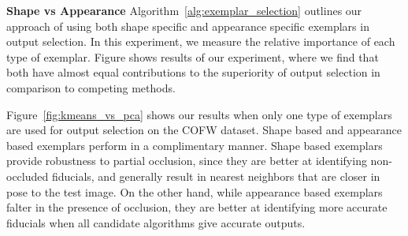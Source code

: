  
\textbf{Shape vs Appearance}
\label{subsec:shape_vs_appearance}
Algorithm~\ref{alg:exemplar_selection} outlines our approach of using both shape specific and
appearance specific exemplars in output selection. In this experiment, we measure the relative
importance of each type of exemplar. Figure shows results of our
experiment, where we find that both have almost equal contributions to the superiority of 
output selection in comparison to competing methods.
 
Figure~\ref{fig:kmeans_vs_pca} shows our results when only one type of exemplars are used
for output selection on the COFW dataset. Shape based and appearance based exemplars perform in a complimentary manner.
Shape based exemplars provide robustness to partial occlusion, since they are better at identifying
non-occluded fiducials, and generally result in nearest neighbors that are closer in pose to the
test image. On the other hand, while appearance based exemplars falter in the presence of occlusion,
they are better at identifying more accurate fiducials when all candidate algorithms give accurate outputs.

